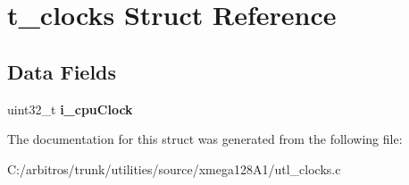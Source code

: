 \hypertarget{structt__clocks}{\section{t\-\_\-clocks Struct Reference}
\label{structt__clocks}
}
\subsection*{Data Fields}
\begin{DoxyCompactItemize}
\item 
\hypertarget{structt__clocks_a50c91a72dfb71a07efe14f43fbed63c6}{uint32\-\_\-t {\bfseries i\-\_\-cpu\-Clock}}\label{structt__clocks_a50c91a72dfb71a07efe14f43fbed63c6}

\end{DoxyCompactItemize}


The documentation for this struct was generated from the following file\-:\begin{DoxyCompactItemize}
\item 
C\-:/arbitros/trunk/utilities/source/xmega128\-A1/utl\-\_\-clocks.\-c\end{DoxyCompactItemize}
